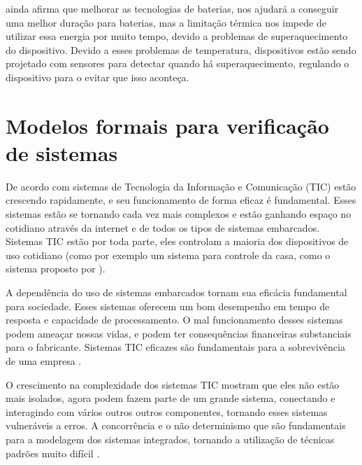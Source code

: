  ainda afirma que melhorar as tecnologias de baterias, nos ajudará a conseguir uma melhor duração para baterias, mas a limitação térmica nos impede de utilizar essa energia por muito tempo, devido a problemas de superaquecimento do dispositivo. Devido a esses problemas de temperatura, dispositivos estão sendo projetado com sensores para detectar quando há superaquecimento, regulando o dispositivo para o evitar que isso aconteça. 


\section{Modelos formais para verificação de sistemas}
 
De acordo com  sistemas de Tecnologia da Informação e Comunicação (TIC) estão crescendo rapidamente, e seu funcionamento de forma eficaz é fundamental. Esses sistemas estão se tornando cada vez mais complexos e estão ganhando espaço no cotidiano através da internet e de todos os tipos de sistemas embarcados. Sistemas TIC estão por toda parte, eles controlam a maioria dos dispositivos de uso cotidiano (como por exemplo um sistema para controle da casa, como o sistema proposto por ).

A dependência do uso de sistemas embarcados tornam sua eficácia fundamental para sociedade. Esses sistemas oferecem um bom desempenho em tempo de resposta e capacidade de processamento. O mal funcionamento desses sistemas podem ameaçar nossas vidas, e podem ter consequências financeiras substanciais para o fabricante. Sistemas TIC eficazes são fundamentais para a sobrevivência de uma empresa \cite{Baier:2008}.


O crescimento na complexidade dos sistemas TIC mostram que eles não estão mais isolados, agora podem fazem parte de um grande sistema, conectando e interagindo com vários outros outros componentes, tornando esses sistemas vulneráveis a erros. 
A concorrência e o não determinismo que são fundamentais para a modelagem dos sistemas integrados, tornando a utilização de técnicas padrões muito difícil \cite{Baier:2008}.

